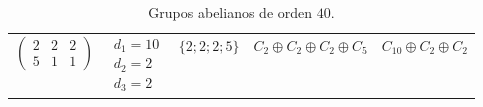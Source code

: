 \begin{ejercicio}
\begin{enumerate}
\begin{table}[h]
\begin{tabular}{c|c|c|c|c}
                $\begin{pmatrix}
                    2 & 2 & 2 \\
                    5 & 1 & 1
                \end{pmatrix}
                $ & $\begin{array}{l}
                    d_1=10 \\
                    d_2=2 \\
                    d_3=2
                \end{array}$ & $\{2; 2; 2; 5\}$ & $C_2 \oplus C_2 \oplus C_2 \oplus C_5$ & $C_{10} \oplus C_2 \oplus C_2$
            \end{tabular}
            \caption{Grupos abelianos de orden $40$.}
            \label{tab:grupos_abelianos_40}
        \end{table}


\end{enumerate}
\end{ejercicio}
